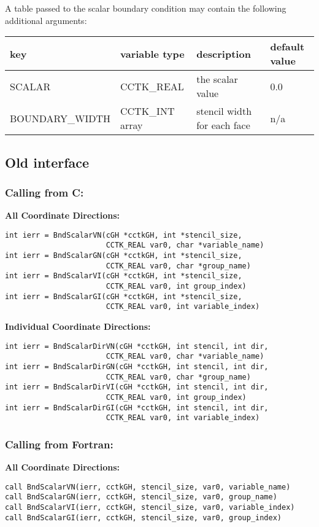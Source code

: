 \documentclass{article}
\begin{document}
A table passed to the scalar boundary condition may contain the
following additional arguments:\\[1mm]
\begin{tabular}{|l|l|l|l|}
\hline
\textbf{key} & \textbf{variable type} & \textbf{description} & \textbf{default value}\\
\hline
SCALAR & CCTK\_REAL & the scalar value & 0.0\\
BOUNDARY\_WIDTH & CCTK\_INT array & stencil width for each face & n/a\\
\hline
\end{tabular}

\subsection{Old interface}

\subsubsection*{Calling from C:}

{\bf All Coordinate Directions:}
\begin{verbatim}
int ierr = BndScalarVN(cGH *cctkGH, int *stencil_size,  
                       CCTK_REAL var0, char *variable_name)
int ierr = BndScalarGN(cGH *cctkGH, int *stencil_size,  
                       CCTK_REAL var0, char *group_name)
int ierr = BndScalarVI(cGH *cctkGH, int *stencil_size,  
                       CCTK_REAL var0, int group_index)
int ierr = BndScalarGI(cGH *cctkGH, int *stencil_size,  
                       CCTK_REAL var0, int variable_index)
\end{verbatim}

\noindent
{\bf Individual Coordinate Directions:}
\begin{verbatim}
int ierr = BndScalarDirVN(cGH *cctkGH, int stencil, int dir,
                       CCTK_REAL var0, char *variable_name)
int ierr = BndScalarDirGN(cGH *cctkGH, int stencil, int dir,
                       CCTK_REAL var0, char *group_name)
int ierr = BndScalarDirVI(cGH *cctkGH, int stencil, int dir,
                       CCTK_REAL var0, int group_index)
int ierr = BndScalarDirGI(cGH *cctkGH, int stencil, int dir,
                       CCTK_REAL var0, int variable_index)
\end{verbatim}

\subsubsection*{Calling from Fortran:}
{\bf All Coordinate Directions:}
\begin{verbatim}
call BndScalarVN(ierr, cctkGH, stencil_size, var0, variable_name)
call BndScalarGN(ierr, cctkGH, stencil_size, var0, group_name)
call BndScalarVI(ierr, cctkGH, stencil_size, var0, variable_index)
call BndScalarGI(ierr, cctkGH, stencil_size, var0, group_index)
\end{verbatim}
\end{document}
